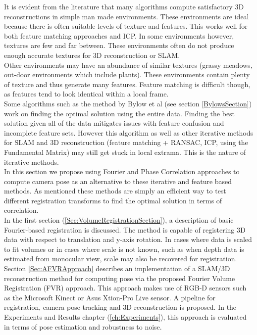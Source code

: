 
It is evident from the literature that many algorithms compute satisfactory 3D reconstructions in simple man made environments. These environments are ideal because there is often suitable levels of texture and features. This works well for both feature matching approaches and ICP. In some environments however, textures are few and far between. These environments often do not produce enough accurate textures for 3D reconstruction or SLAM. \\

Other environments may have an abundance of similar textures (grassy meadows, out-door environments which include plants). These environments contain plenty of texture and thus generate many features. Feature matching is difficult though, as features tend to look identical within a local frame. \\

Some algorithms such as the method by Bylow et al (see section \ref{BylowsSection}) work on finding the optimal solution using the entire data. Finding the best solution given all of the data mitigates issues with feature confusion and incomplete feature sets. However this algorithm as well as other iterative methods for SLAM and 3D reconstruction (feature matching + RANSAC, ICP, using the Fundamental Matrix) may still get stuck in local extrama. This is the nature of iterative methods. \\

In this section we propose using Fourier and Phase Correlation approaches to compute camera pose as an alternative to these iterative and feature based methods. As mentioned these methods are simply an efficient way to test different registration transforms to find the optimal solution in terms of correlation. \\

In the first section (\ref{Sec:VolumeRegistrationSection}), a description of basic Fourier-based registration is discussed. The method is capable of registering 3D data with respect to translation and y-axis rotation. In cases where data is scaled to fit volumes or in cases where scale is not known, such as when depth data is estimated from monocular view, scale may also be recovered for registration. \\

Section \ref{Sec:AFVRApproach} describes an implementation of a SLAM/3D reconstruction method for computing pose via the proposed Fourier Volume Registration (FVR) approach. This approach makes use of RGB-D sensors such as the Microsoft Kinect or Asus Xtion-Pro Live sensor. A pipeline for registration, camera pose tracking and 3D reconstruction is proposed. In the Experiments and Results chapter (\ref{ch:Experiments}), this approach is evaluated in terms of pose estimation and robustness to noise. \\

